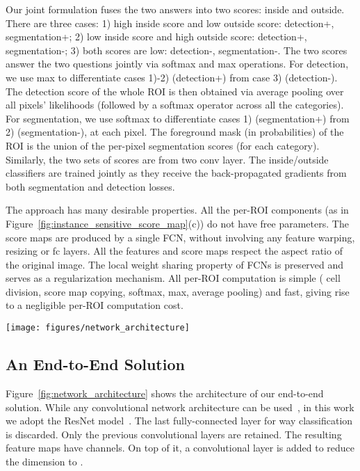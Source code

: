 \documentclass[10pt,twocolumn,letterpaper]{article}
\begin{document}
Our joint formulation fuses the two answers into two scores: inside and outside. There are three cases: 1) high inside score and low outside score: detection+, segmentation+; 2) low inside score and high outside score: detection+, segmentation-; 3) both scores are low: detection-, segmentation-. The two scores answer the two questions jointly via softmax and max operations. For detection, we use max to differentiate cases 1)-2) (detection+) from case 3) (detection-). The detection score of the whole ROI is then obtained via average pooling over all pixels' likelihoods (followed by a softmax operator across all the categories). For segmentation, we use softmax to differentiate cases 1) (segmentation+) from 2) (segmentation-), at each pixel. The foreground mask (in probabilities) of the ROI is the union of the per-pixel segmentation scores (for each category). Similarly, the two sets of scores are from two  conv layer. The inside/outside classifiers are trained jointly as they receive the back-propagated gradients from both segmentation and detection losses. 

The approach has many desirable properties. All the per-ROI components (as in Figure~\ref{fig:instance_sensitive_score_map}(c)) do not have free parameters. The score maps are produced by a single FCN, without involving any feature warping, resizing or fc layers. All the features and score maps respect the aspect ratio of the original image. The local weight sharing property of FCNs is preserved and serves as a regularization mechanism. All per-ROI computation is simple ( cell division, score map copying, softmax, max, average pooling) and fast, giving rise to a negligible per-ROI computation cost.

\begin{figure*}
	\centering
	\texttt{[image: figures/network\_architecture]}
	\caption{Overall architecture of FCIS. A region proposal network (RPN)~\cite{ren2015faster} shares the convolutional feature maps with FCIS. The proposed region-of-interests (ROIs) are applied on the score maps for joint object segmentation and detection. The learnable weight layers are fully convolutional and computed on the whole image. The per-ROI computation cost is negligible.}
	\label{fig:network_architecture}
\end{figure*}

\subsection{An End-to-End Solution}
\label{sec.end_to_end}
Figure~\ref{fig:network_architecture} shows the architecture of our end-to-end solution. While any convolutional network architecture can be used~\cite{simonyan2015very,szegedy2015going}, in this work we adopt the ResNet model~\cite{he2016deep}. The last fully-connected layer for way classification is discarded. Only the previous convolutional layers are retained. The resulting feature maps have  channels. On top of it, a  convolutional layer is added to reduce the dimension to .
\end{document}

